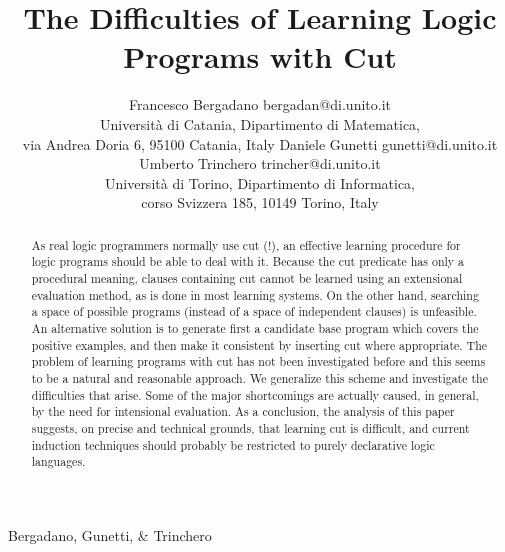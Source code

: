 
%
{Bergadano, Gunetti, \& Trinchero}
 
\title{The Difficulties of Learning Logic Programs with Cut}
 
\author{\name Francesco Bergadano \email bergadan@di.unito.it \\
       \addr Universit\`{a} di Catania, Dipartimento di Matematica, \\
       via Andrea Doria 6, 95100 Catania, Italy
       \AND
       \name Daniele Gunetti \email gunetti@di.unito.it \\
       \name Umberto Trinchero \email trincher@di.unito.it \\
       \addr Universit\`{a} di Torino, Dipartimento di Informatica, \\
       corso Svizzera 185, 10149 Torino, Italy}
\newtheorem{newdef}{Definition}
 

 
\maketitle
 
\begin{abstract}
As real logic programmers normally use cut (!), an effective learning
procedure for logic programs should be able to deal with it.
Because the cut predicate has only a procedural meaning,
clauses containing cut cannot be learned using an extensional
evaluation method, as is done in most learning systems.
On the other hand, searching a space of possible programs
(instead of a space of independent clauses) is unfeasible.
An alternative solution is to generate first a candidate
base program which covers the positive examples, and then
make it consistent by inserting cut where appropriate.
The problem of learning programs with cut has not been
investigated before and this seems to be a natural and reasonable 
approach. We generalize this scheme and investigate 
the difficulties that arise.  Some of the major shortcomings 
are actually caused, in general, by the
need for intensional evaluation. As a conclusion, the analysis of this paper
suggests, on precise and technical grounds, that learning cut is difficult,
and current induction techniques should probably be restricted to purely
declarative logic languages.\\
 
\end{abstract}
 
